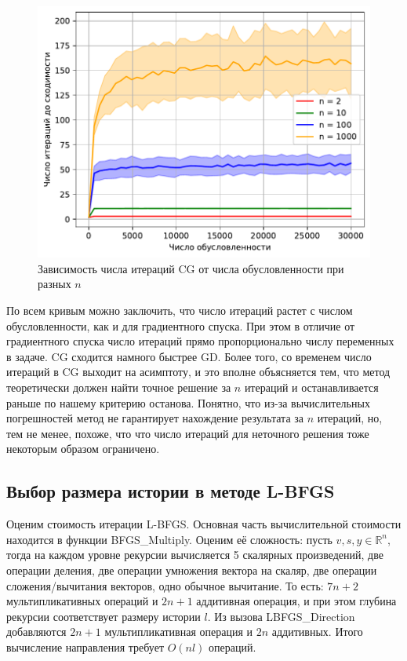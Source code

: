 \documentclass[11pt]{article}
\begin{document}
\begin{figure}[H]
	\centering
    \includegraphics[width=1.0\textwidth]{pics/1/CG_iterations_vs_condition_number.pdf}
\captionsetup{justification=centering}
\caption{Зависимость числа итераций CG от числа обусловленности при разных $n$}
\end{figure}

По всем кривым можно заключить, что число итераций растет с числом обусловленности, как и для градиентного спуска. При этом в отличие от градиентного спуска число итераций прямо пропорционально числу переменных в задаче. CG сходится намного быстрее GD. Более того, со временем число итераций в CG выходит на асимптоту, и это вполне объясняется тем, что метод теоретически должен найти точное решение за $n$ итераций и останавливается раньше по нашему критерию останова. Понятно, что из-за вычислительных погрешностей метод не гарантирует нахождение результата за $n$ итераций, но, тем не менее, похоже, что что число итераций для неточного решения тоже некоторым образом ограничено.



\subsection{Выбор размера истории в методе L-BFGS}

Оценим стоимость итерации L-BFGS. Основная часть вычислительной стоимости находится в функции BFGS\_Multiply. Оценим её сложность: пусть $v, s, y \in \mathbb{R}^n$, тогда
на каждом уровне рекурсии вычисляется 5 скалярных произведений, две операции деления, две операции умножения вектора на скаляр, две операции сложения/вычитания векторов, одно обычное вычитание. То есть: $7n + 2$ мультипликативных операций и $2n + 1$ аддитивная операция, и при этом глубина рекурсии соответствует размеру истории $l$. Из вызова LBFGS\_Direction добавляются $2n + 1$ мультипликативная операция и $2n$ аддитивных. Итого вычисление направления требует $O(nl)$ операций.
\end{document}
